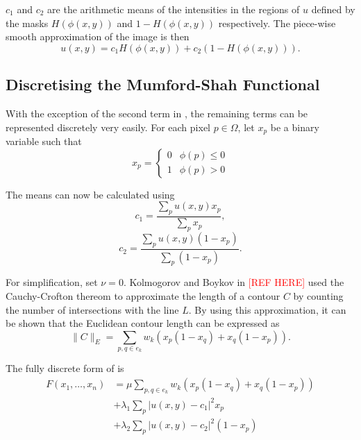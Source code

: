 \documentclass[10pt, journal, letterpaper, onecolumn, draftcls]{IEEEtran}
\begin{document}
$c_1$ and $c_2$ are the arithmetic means of the intensities in the regions of $u$ defined by the masks $H(\phi(x,y))$ and $1-H(\phi(x,y))$ respectively. The piece-wise smooth approximation of the image is then 
\begin{equation}
	u(x,y) = c_1 H(\phi(x,y)) + c_2(1-H(\phi(x,y))).
	\label{eq:piecewiseapproximation}
\end{equation}

\subsection{Discretising the Mumford-Shah Functional}
With the exception of the second term in , the remaining terms can be represented discretely very easily. For each pixel $p \in \Omega$, let $x_p$ be a binary variable such that
\begin{equation}
	x_p = 
	\begin{cases} 
	0 & \phi(p)\leq 0 \\
	1 & \phi(p)> 0
	\end{cases}
\end{equation}

The means can now be calculated using 
\begin{equation}
	c_1 = \frac{\sum_p u(x,y)x_p}{\sum_p x_p},
\end{equation}
\begin{equation}
	c_2 = \frac{\sum_p u(x,y)(1-x_p)}{\sum_p (1-x_p)}.
\end{equation}

For simplification, set $\nu = 0$. Kolmogorov and Boykov in  \textcolor{red}{[REF HERE]} used the Cauchy-Crofton thereom to approximate the length of a contour $C$ by counting the number of intersections with the line $L$. By using this approximation, it can be shown that the Euclidean contour length can be expressed as
\begin{equation}
	\lVert C \rVert_E = \sum_{p,q \in e_k} w_k( x_p(1-x_q) + x_q(1-x_p)).
\end{equation}

The fully discrete form of  is
\begin{equation}
	\begin{split}
	F(x_1, \ldots, x_n) & = \mu \sum_{p,q \in e_k} w_k( x_p(1-x_q) + x_q(1-x_p)) \\
	& + \lambda_1 \sum_p |u(x,y)-c_1|^2x_p \\
	& + \lambda_2 \sum_p |u(x,y)-c_2|^2(1-x_p)
	\end{split}
	\label{eq:discretemumfordshah}
\end{equation}
\end{document}
